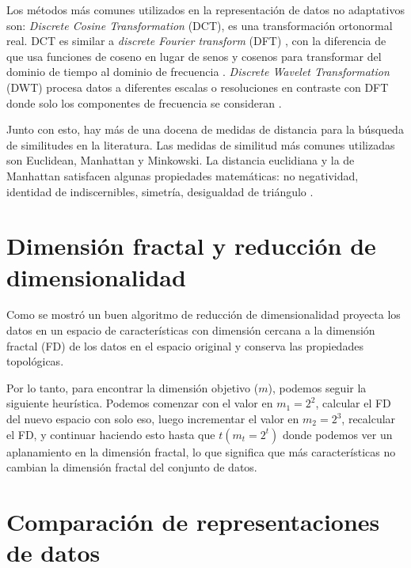 Los métodos más comunes utilizados en la representación de datos no adaptativos son: \textit{Discrete Cosine Transformation} (DCT), es una transformación ortonormal real. DCT es similar a \textit{discrete Fourier transform} (DFT) \cite{Faloutsos94}, con la diferencia de que usa funciones de coseno en lugar de senos y cosenos para transformar del dominio de tiempo al dominio de frecuencia \cite{Bettaiah14}. \textit{Discrete Wavelet Transformation} (DWT) procesa datos a diferentes escalas o resoluciones en contraste con DFT \cite{Faloutsos94} donde solo los componentes de frecuencia se consideran  \cite{Bettaiah14}.

Junto con esto, hay más de una docena de medidas de distancia para la búsqueda de similitudes en la literatura. Las medidas de similitud más comunes utilizadas son Euclidean, Manhattan y Minkowski. La distancia euclidiana y la de Manhattan satisfacen algunas propiedades matemáticas: no negatividad, identidad de indiscernibles, simetría, desigualdad de triángulo \cite{han2011data}.

\section{Dimensión fractal y reducción de dimensionalidad}

Como se mostró \cite{citeulike:fractal:encoders}   un buen algoritmo de reducción de dimensionalidad   proyecta los datos en un espacio de características con dimensión cercana a la dimensión fractal (FD) de los datos en el espacio original y conserva las propiedades topológicas.

Por lo tanto, para encontrar la dimensión objetivo ($ m $), podemos seguir la siguiente heurística. Podemos comenzar con el valor en $ m_1 = 2^2 $, calcular el FD del nuevo espacio con solo eso, luego incrementar el valor en $ m_2 = 2^3 $, recalcular el FD, y continuar haciendo esto hasta que $ t(m_t = 2^t) $ donde podemos ver un aplanamiento en la dimensión fractal, lo que significa que más características no cambian la dimensión fractal del conjunto de datos.
 
\section{Comparación de representaciones de datos} \label{sec:fractal-dimension}

